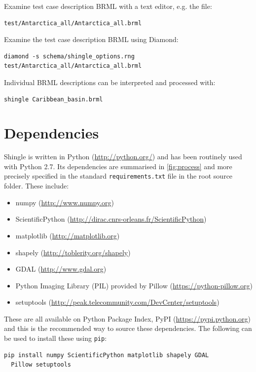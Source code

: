 \documentclass[a4paper, 10pt]{book}
\providecommand{\shingle}{Shingle\xspace}
\providecommand{\brml}{BRML\xspace}
\begin{document}
\noindent
Examine test case description \brml with a text editor, e.g. the file:
\begin{verbatim}
test/Antarctica_all/Antarctica_all.brml
\end{verbatim}

\noindent
Examine the test case description \brml using Diamond:
\begin{verbatim}
diamond -s schema/shingle_options.rng test/Antarctica_all/Antarctica_all.brml
\end{verbatim}

\noindent
Individual \brml descriptions can be interpreted and processed with:
\begin{verbatim}
shingle Caribbean_basin.brml
\end{verbatim}

\section{Dependencies}

\shingle is written in Python
(\url{http://python.org/})
and has been routinely used with Python 2.7.
Its dependencies are summarised in \cref{fig:process}
and more precisely specified 
in the standard 
\verb+requirements.txt+ file in the root source folder.
These include:

\begin{itemize}
\item numpy
  (\url{http://www.numpy.org})
\item ScientificPython
  (\url{http://dirac.cnrs-orleans.fr/ScientificPython})
\item matplotlib
  (\url{http://matplotlib.org})
\item shapely
  (\url{http://toblerity.org/shapely})
\item GDAL
  (\url{http://www.gdal.org})
\item Python Imaging Library (PIL) provided by Pillow
  (\url{https://python-pillow.org})
\item setuptools
  (\url{http://peak.telecommunity.com/DevCenter/setuptools})
\end{itemize}

\noindent
These are all available on Python Package Index, PyPI
(\url{https://pypi.python.org})
and this is the recommended way to source these dependencies.
The following can be used to install these using \verb+pip+:
\begin{verbatim}
pip install numpy ScientificPython matplotlib shapely GDAL
  Pillow setuptools
\end{verbatim}
\end{document}
